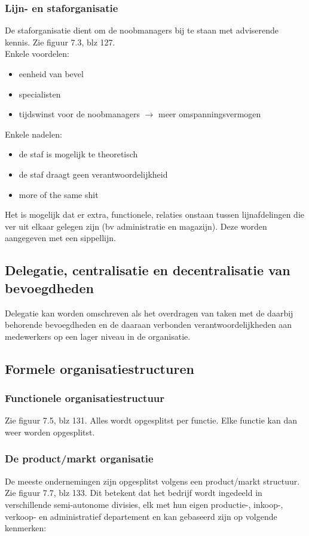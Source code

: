 \documentclass[12pt]{article}
\begin{document}
\subsubsection{Lijn- en staforganisatie}
De staforganisatie dient om de noobmanagers bij te staan met adviserende kennis. Zie figuur 7.3, blz 127.\\
Enkele voordelen:
\begin{itemize}
\item eenheid van bevel
\item specialisten
\item tijdswinst voor de noobmanagers $\rightarrow$ meer omspanningsvermogen
\end{itemize}
Enkele nadelen:
\begin{itemize}
\item de staf is mogelijk te theoretisch
\item de staf draagt geen verantwoordelijkheid
\item more of the same shit
\end{itemize}
Het is mogelijk dat er extra, functionele, relaties onstaan tussen lijnafdelingen die ver uit elkaar gelegen zijn (bv administratie en magazijn). Deze worden aangegeven met een sippellijn.
\subsection{Delegatie, centralisatie en decentralisatie van bevoegdheden}
Delegatie kan worden omschreven als het overdragen van taken met de daarbij behorende bevoegdheden en de daaraan verbonden verantwoordelijkheden aan medewerkers op een lager niveau in de organisatie.
\subsection{Formele organisatiestructuren}
\subsubsection{Functionele organisatiestructuur}
Zie figuur 7.5, blz 131. Alles wordt opgesplitst per functie. Elke functie kan dan weer worden opgesplitst.
\subsubsection{De product/markt organisatie}
De meeste ondernemingen zijn opgesplitst volgens een product/markt structuur. Zie figuur 7.7, blz 133. Dit betekent dat het bedrijf wordt ingedeeld in verschillende semi-autonome divisies, elk met hun eigen productie-, inkoop-, verkoop- en administratief departement en kan gebaseerd zijn op volgende kenmerken:
\end{document}
